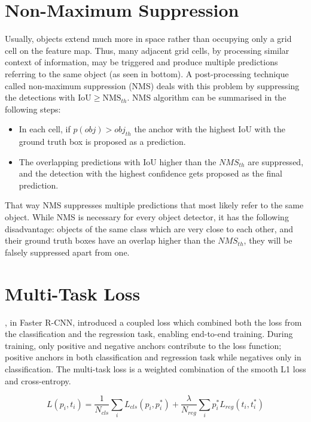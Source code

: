 \section{Non-Maximum Suppression}
Usually, objects extend much more in space rather than occupying only a grid cell on the feature map. Thus, many adjacent grid cells, by processing similar context of information, may be triggered and produce multiple predictions referring to the same object (as seen in  bottom). A post-processing technique called non-maximum suppression (NMS) deals with this problem by suppressing the detections with $\text{IoU}\geq\text{NMS}_{th}$. NMS algorithm can be summarised in the following steps:

\begin{itemize}
  \item In each cell, if $p(obj)>obj_{th}$ the anchor with the highest IoU with the ground truth box is proposed as a prediction. 
  \item The overlapping predictions with IoU higher than the $NMS_{th}$ are suppressed, and the detection with the highest confidence gets proposed as the final prediction. 
\end{itemize}

That way NMS suppresses multiple predictions that most likely refer to the same object. While NMS is necessary for every object detector, it has the following disadvantage: objects of the same class which are very close to each other, and their ground truth boxes have an overlap higher than the $NMS_{th}$, they will be falsely suppressed apart from one. 

\section{Multi-Task Loss} 
\cite{ren2015faster}, in Faster R-CNN, introduced a coupled loss which combined both the loss from the classification and the regression task, enabling end-to-end training. During training, only positive and negative anchors contribute to the loss function; positive anchors in both classification and regression task while negatives only in classification.
The multi-task loss is a weighted combination of the smooth L1 loss and cross-entropy.

\begin{equation}
  L(p_i,t_i) = \frac{1}{N_{cls}}\sum_i{L_{cls}(p_i,p_i^*)}+ \frac{\lambda}{N_{reg}}\sum_i p_i^*{L_{reg}(t_i,t_i^*)}
\end{equation} 

